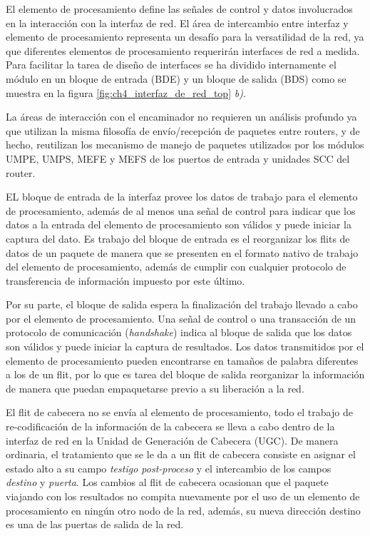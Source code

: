 El elemento de procesamiento define las señales de control y datos involucrados en la interacción con la interfaz de red. El área de intercambio entre interfaz y elemento de procesamiento representa un desafío para la versatilidad de la red, ya que diferentes elementos de procesamiento requerirán interfaces de red a medida. Para facilitar la tarea de diseño de interfaces se ha dividido internamente el módulo en un bloque de entrada (BDE) y un bloque de salida (BDS) como se muestra en la figura \ref{fig:ch4_interfaz_de_red_top} \textit{b)}.

La áreas de interacción con el encaminador no requieren un análisis profundo ya que utilizan la misma filosofía de envío/recepción de paquetes entre routers, y de hecho, reutilizan los mecanismo de manejo de paquetes utilizados por los módulos UMPE, UMPS, MEFE y  MEFS de los puertos de entrada y unidades SCC del router.

EL bloque de entrada de la interfaz provee los datos de trabajo para el elemento de procesamiento, además de al menos una señal de control para indicar que los datos a la entrada del elemento de procesamiento son válidos y puede iniciar la captura del dato. Es trabajo del bloque de entrada es el reorganizar los flits de datos de un paquete de manera que se presenten en el formato nativo de trabajo del elemento de procesamiento, además de cumplir con cualquier protocolo de transferencia de información impuesto por este último.

Por su parte, el bloque de salida espera la finalización del trabajo llevado a cabo por el elemento de procesamiento. Una señal de control o una transacción de un protocolo de comunicación (\textit{handshake}) indica al bloque de salida que los datos son válidos y puede iniciar la captura de resultados. Los datos transmitidos por el elemento de procesamiento pueden encontrarse en tamaños de palabra diferentes a los de un flit, por lo que es tarea del bloque de salida reorganizar la información de manera que puedan empaquetarse previo a su liberación a la red.

El flit de cabecera no se envía al elemento de procesamiento, todo el trabajo de re-codificación de la información de la cabecera se lleva a cabo dentro de la interfaz de red en la Unidad de Generación de Cabecera (UGC). De manera ordinaria, el tratamiento que se le da a un flit de cabecera consiste en asignar el estado alto a su campo \textit{testigo post-proceso} y el intercambio de los campos \textit{destino} y \textit{puerta}. Los cambios al flit de cabecera ocasionan que el paquete viajando con los resultados no compita nuevamente por el uso de un elemento de procesamiento en ningún otro nodo de la red, además, su nueva dirección destino es una de las puertas de salida de la red.

